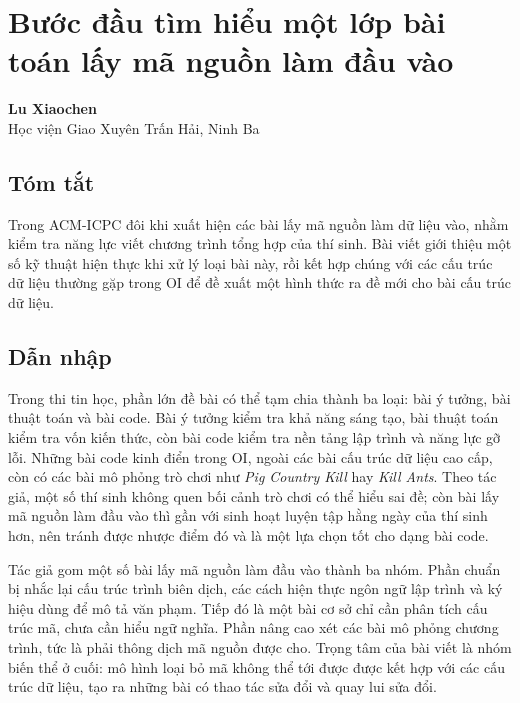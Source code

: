 \documentclass[11pt]{article}
\begin{document}
\section{Bước đầu tìm hiểu một lớp bài toán lấy mã nguồn làm đầu vào}

\begin{center}
\textbf{Lu Xiaochen}\\
Học viện Giao Xuyên Trấn Hải, Ninh Ba
\end{center}

\subsection*{Tóm tắt}

Trong ACM-ICPC đôi khi xuất hiện các bài lấy mã nguồn làm dữ liệu vào, nhằm kiểm
tra năng lực viết chương trình tổng hợp của thí sinh. Bài viết giới thiệu một số
kỹ thuật hiện thực khi xử lý loại bài này, rồi kết hợp chúng với các cấu trúc dữ
liệu thường gặp trong OI để đề xuất một hình thức ra đề mới cho bài cấu trúc dữ
liệu.

\subsection{Dẫn nhập}

Trong thi tin học, phần lớn đề bài có thể tạm chia thành ba loại: bài ý tưởng,
bài thuật toán và bài code. Bài ý tưởng kiểm tra khả năng sáng tạo, bài thuật
toán kiểm tra vốn kiến thức, còn bài code kiểm tra nền tảng lập trình và năng
lực gỡ lỗi. Những bài code kinh điển trong OI, ngoài các bài cấu trúc dữ liệu
cao cấp, còn có các bài mô phỏng trò chơi như \emph{Pig Country Kill} hay
\emph{Kill Ants}. Theo tác giả, một số thí sinh không quen bối cảnh trò chơi có
thể hiểu sai đề; còn bài lấy mã nguồn làm đầu vào thì gần với sinh hoạt luyện
tập hằng ngày của thí sinh hơn, nên tránh được nhược điểm đó và là một lựa chọn
tốt cho dạng bài code.

Tác giả gom một số bài lấy mã nguồn làm đầu vào thành ba nhóm. Phần chuẩn bị
nhắc lại cấu trúc trình biên dịch, các cách hiện thực ngôn ngữ lập trình và ký
hiệu dùng để mô tả văn phạm. Tiếp đó là một bài cơ sở chỉ cần phân tích cấu trúc
mã, chưa cần hiểu ngữ nghĩa. Phần nâng cao xét các bài mô phỏng chương trình,
tức là phải thông dịch mã nguồn được cho. Trọng tâm của bài viết là nhóm biến
thể ở cuối: mô hình loại bỏ mã không thể tới được được kết hợp với các cấu trúc
dữ liệu, tạo ra những bài có thao tác sửa đổi và quay lui sửa đổi.
\end{document}
